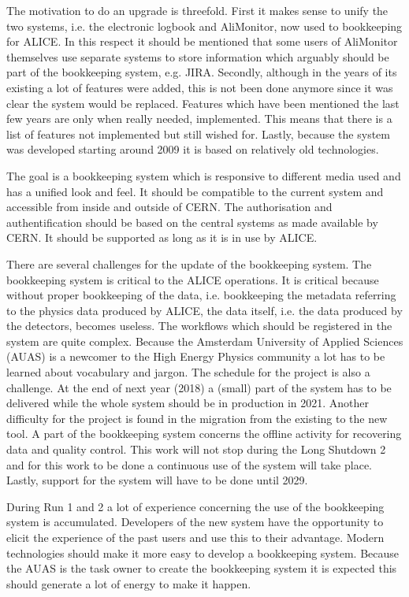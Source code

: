 The motivation to do an upgrade is threefold. First it makes sense to unify the two systems, i.e. the electronic logbook and AliMonitor, now used to bookkeeping for ALICE. In this respect it should be mentioned that some users of AliMonitor themselves use separate systems to store information which arguably should be part of the bookkeeping system, e.g. JIRA. Secondly, although in the years of its existing a lot of features were added, this is not been done anymore since it was clear the system would be replaced. Features which have been mentioned the last few years are only when really needed, implemented. This means that there is a list of features not implemented but still wished for. Lastly, because the system was developed starting around 2009 it is based on relatively old technologies. 

The goal is a bookkeeping system which is responsive to different media used and has a unified look and feel. It should be compatible to the current system and accessible from inside and outside of CERN. The authorisation and authentification should be based on the central systems as made available by CERN. It should be supported as long as it is in use by ALICE.

There are several challenges for the update of the bookkeeping system. The bookkeeping system is critical to the ALICE operations. It is critical because without proper bookkeeping of the data, i.e. bookkeeping the metadata referring to the physics data produced by ALICE, the data itself, i.e. the data produced by the detectors, becomes useless. The workflows which should be registered in the system are quite complex. Because the Amsterdam University of Applied Sciences (AUAS) is a newcomer to the High Energy Physics community a lot has to be learned about vocabulary and jargon. The schedule for the project is also a challenge. At the end of next year (2018) a (small) part of the system has to be delivered while the whole system should be in production in 2021. Another difficulty for the project is found in the migration from the existing to the new tool. A part of the bookkeeping system concerns the offline activity for recovering data and quality control. This work will not stop during the Long Shutdown 2 and for this work to be done a continuous use of the system will take place. Lastly, support for the system will have to be done until 2029.

During Run 1 and 2 a lot of experience concerning the use of the bookkeeping system is accumulated. Developers of the new system have the opportunity to elicit the experience of the past users and use this to their advantage. Modern technologies should make it more easy to develop a bookkeeping system. Because the AUAS is the task owner to create the bookkeeping system it is expected this should generate a lot of energy to make it happen.

